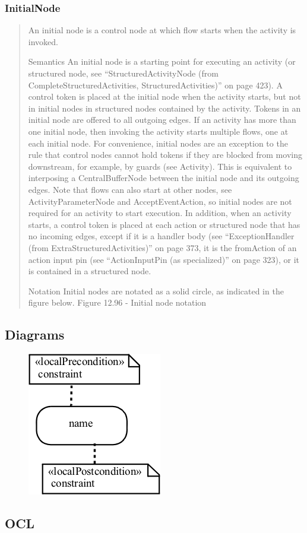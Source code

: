 \subsubsection{InitialNode}
\begin{quotation}
An initial node is a control node at which flow starts when the activity is invoked.

Semantics
An initial node is a starting point for executing an activity (or structured node, see “StructuredActivityNode (from
CompleteStructuredActivities, StructuredActivities)” on page 423). A control token is placed at the initial node when the
activity starts, but not in initial nodes in structured nodes contained by the activity. Tokens in an initial node are offered
to all outgoing edges. If an activity has more than one initial node, then invoking the activity starts multiple flows, one at
each initial node. For convenience, initial nodes are an exception to the rule that control nodes cannot hold tokens if they
are blocked from moving downstream, for example, by guards (see Activity). This is equivalent to interposing a
CentralBufferNode between the initial node and its outgoing edges.
Note that flows can also start at other nodes, see ActivityParameterNode and AcceptEventAction, so initial nodes are not
required for an activity to start execution. In addition, when an activity starts, a control token is placed at each action or
structured node that has no incoming edges, except if it is a handler body (see “ExceptionHandler (from
ExtraStructuredActivities)” on page 373, it is the fromAction of an action input pin (see “ActionInputPin (as specialized)”
on page 323), or it is contained in a structured node.

Notation
Initial nodes are notated as a solid circle, as indicated in the figure below.
Figure 12.96 - Initial node notation


\end{quotation}

\subsection{Diagrams}
\begin{figure}
\includegraphics[scale=1]{./pics/local_postconditionsDiagram.PNG}
\end{figure}
\subsection{OCL}
\label{sec:OCL}

